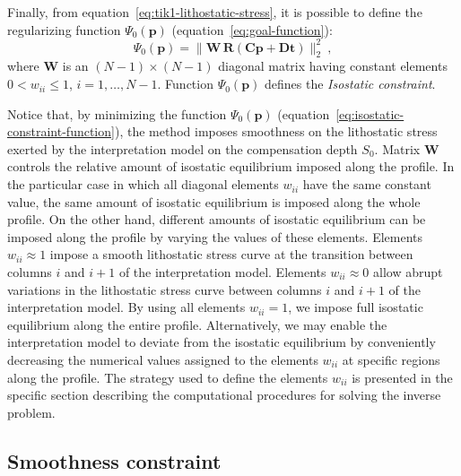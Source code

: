 \documentclass[manuscript]{geophysics}
\begin{document}
Finally, from equation~\ref{eq:tik1-lithostatic-stress}, it is possible to
define the regularizing function $\Psi_{0}(\mathbf{p})$ 
(equation~\ref{eq:goal-function}): 
\begin{equation}
\Psi_{0}(\mathbf{p}) = \| \mathbf{W} \, \mathbf{R} \left( \mathbf{C} \mathbf{p} + \mathbf{D}
\mathbf{t} \right) \|_{2}^{2} \: ,
\label{eq:isostatic-constraint-function}
\end{equation}
where $\mathbf{W}$ is an $(N - 1) \times (N - 1)$ diagonal matrix having constant
elements $0 < w_{ii} \le 1$, $i = 1, \dots, N - 1$. 
Function $\Psi_{0}(\mathbf{p})$ defines the \textit{Isostatic constraint}.

Notice that, by minimizing the function $\Psi_{0}(\mathbf{p})$ 
(equation~\ref{eq:isostatic-constraint-function}), the method imposes smoothness on 
the lithostatic stress exerted by the interpretation model on the 
compensation depth $S_{0}$.
Matrix $\mathbf{W}$ controls the relative amount of isostatic equilibrium imposed 
along the profile. 
In the particular case in which all diagonal elements $w_{ii}$ have the same
constant value, the same amount of isostatic equilibrium is imposed along the 
whole profile. On the other hand, different amounts of isostatic equilibrium
can be imposed along the profile by varying the values of these elements.
Elements $w_{ii} \approx 1$ impose a smooth lithostatic stress curve 
at the transition between columns $i$ and $i+1$ of the interpretation model.
Elements $w_{ii} \approx 0$ allow abrupt variations in the lithostatic stress 
curve between columns $i$ and $i+1$ of the interpretation model.
By using all elements $w_{ii} = 1$, we impose full isostatic equilibrium 
along the entire profile. Alternatively, we may enable the interpretation model 
to deviate from the isostatic equilibrium by conveniently decreasing the numerical values
assigned to the elements $w_{ii}$ at specific regions along the profile. 
The strategy used to define the elements $w_{ii}$ is 
presented in the specific section describing the computational procedures
for solving the inverse problem.


\subsection{Smoothness constraint}
\end{document}
